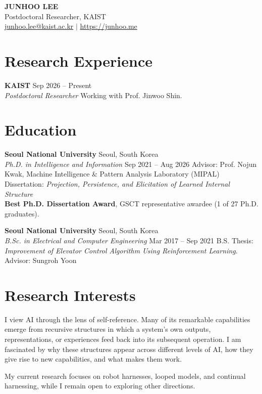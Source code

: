\documentclass[10pt, letterpaper]{article}
\begin{document}
\begin{center}
    {\Huge \textbf{JUNHOO LEE}} \\ \vspace{2mm}
    Postdoctoral Researcher, KAIST \\ \vspace{1mm}
    \small
    \href{mailto:junhoo.lee@kaist.ac.kr}{junhoo.lee@kaist.ac.kr} $|$ \href{https://junhoo.me}{https://junhoo.me}
\end{center}

\section{Research Experience}
\textbf{KAIST} \hfill Sep 2026 -- Present \\
\textit{Postdoctoral Researcher}
\newline
{\small Working with Prof. Jinwoo Shin.}

\section{Education}
\textbf{Seoul National University} \hfill Seoul, South Korea \\
\textit{Ph.D. in Intelligence and Information} \hfill Sep 2021 -- Aug 2026
\newline
{\small Advisor: Prof. Nojun Kwak, Machine Intelligence \& Pattern Analysis Laboratory (MIPAL)} \\
{\small Dissertation: \textit{Projection, Persistence, and Elicitation of Learned Internal Structure}} \\
{\small \textbf{Best Ph.D. Dissertation Award}, GSCT representative awardee (1 of 27 Ph.D. graduates).}

\vspace{1mm}

\textbf{Seoul National University} \hfill Seoul, South Korea \\
\textit{B.Sc. in Electrical and Computer Engineering} \hfill Mar 2017 -- Sep 2021
\newline
{\small B.S. Thesis: \textit{Improvement of Elevator Control Algorithm Using Reinforcement Learning}. Advisor: Sungroh Yoon}

\section{Research Interests}
{\normalsize
I view AI through the lens of self-reference. Many of its remarkable capabilities emerge from recursive structures in which a system's own outputs, representations, or experiences feed back into its subsequent operation. I am fascinated by why these structures appear across different levels of AI, how they give rise to new capabilities, and what makes them work.

My current research focuses on robot harnesses, looped models, and continual harnessing, while I remain open to exploring other directions.
}
\end{document}
